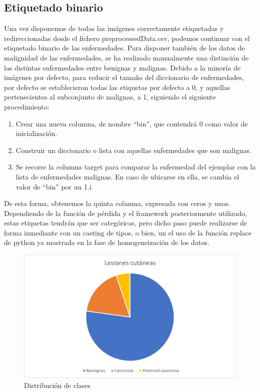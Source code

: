  \subsection{Etiquetado binario}
 
Una vez disponemos de todas las imágenes correctamente etiquetadas y redireccionadas desde el fichero preprocessedData.csv, podemos continuar con el etiquetado binario de las enfermedades. Para disponer también de los datos de malignidad de las enfermedades, se ha realizado manualmente una distinción de las distintas enfermedades entre benignas y malignas. Debido a la minoría de imágenes por defecto, para reducir el tamaño del diccionario de enfermedades, por defecto se establecieron todas las etiquetas por defecto a 0, y aquellas pertenecientes al subconjunto de malignas, a 1, siguiendo el siguiente procedimiento:
 
 \begin{enumerate}
 	\item Crear una nueva columna, de nombre ``bin'', que contendrá 0 como valor de inicialización.
 	\item Construir un diccionario o lista con aquellas enfermedades que son malignas.
 	\item Se recorre la columna target para comparar la enfermedad del ejemplar con la lista de enfermedades malignas. En caso de ubicarse en ella, se cambia el valor de ``bin'' por un 1.i
\end{enumerate}

De esta forma, obtenemos la quinta columna, expresada con ceros y unos. Dependiendo de la función de pérdida y el framework posteriormente utilizado, estas etiquetas tendrán que ser categóricas, pero dicho paso puede realizarse de forma inmediante con un casting de tipos, o bien, un el uso de la función replace de python ya mostrada en la fase de homogeneización de los datos.



\begin{figure}[H]
	\centering
	\label {tartabinaria}
	\includegraphics[scale = 0.7]{imagenes/datasetfinal.png}
	\caption{Distribución de clases}
\end{figure}

